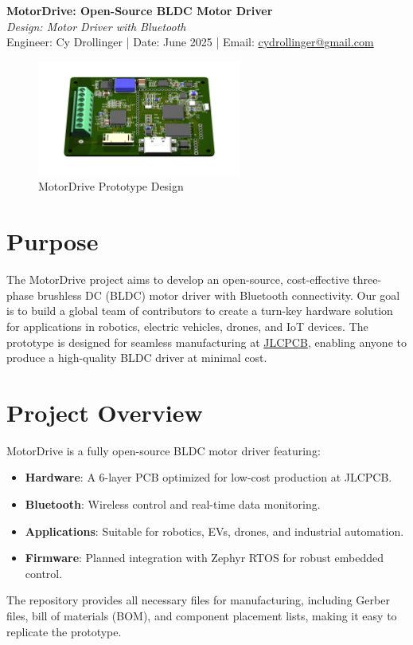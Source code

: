 \documentclass[11pt]{article}
\begin{document}
\begin{center}
    {\Huge \textbf{MotorDrive: Open-Source BLDC Motor Driver}}\\
    \vspace{0.2cm}
    {\large \textit{Design: Motor Driver with Bluetooth}}\\
    \vspace{0.1cm}
    {\normalsize Engineer: Cy Drollinger \quad | \quad Date: June 2025 \quad | \quad Email: \href{mailto:cydrollinger@gmail.com}{cydrollinger@gmail.com}}
\end{center}

\vspace{0.5cm}

\begin{figure}[h]
    \centering
    \includegraphics[width=0.6\textwidth]{motorDRVjlc.png}
    \caption{MotorDrive Prototype Design}
    \label{fig:motorDRV}
\end{figure}

\section{Purpose}
The MotorDrive project aims to develop an open-source, cost-effective three-phase brushless DC (BLDC) motor driver with Bluetooth connectivity. Our goal is to build a global team of contributors to create a turn-key hardware solution for applications in robotics, electric vehicles, drones, and IoT devices. The prototype is designed for seamless manufacturing at \href{https://jlcpcb.com}{JLCPCB}, enabling anyone to produce a high-quality BLDC driver at minimal cost.

\section{Project Overview}
MotorDrive is a fully open-source BLDC motor driver featuring:
\begin{itemize}[leftmargin=*]
    \item \textbf{Hardware}: A 6-layer PCB optimized for low-cost production at JLCPCB.
    \item \textbf{Bluetooth}: Wireless control and real-time data monitoring.
    \item \textbf{Applications}: Suitable for robotics, EVs, drones, and industrial automation.
    \item \textbf{Firmware}: Planned integration with Zephyr RTOS for robust embedded control.
\end{itemize}
The repository provides all necessary files for manufacturing, including Gerber files, bill of materials (BOM), and component placement lists, making it easy to replicate the prototype.
\end{document}
